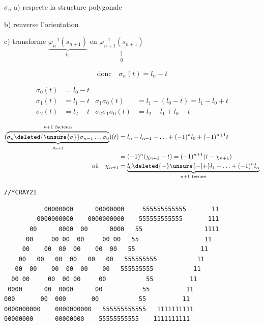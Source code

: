 

$\sigma_n$ \quad a) respecte la structure polygonale

b) renverse l'orientation

c) transforme $\underbrace{\varphi_n^{-1}(s_{n+1})}_{l_n}$ en $\underset{\substack{\Vert\\0}}{\varphi_{n+1}^{-1}(s_{n+1})}$

\[ \text{donc}\quad \sigma_n(t)=l_n-t \]

\[ \begin{aligned}
\sigma_0(t)&=l_0-t\\
\sigma_1(t)&=l_1-t &\sigma_1\sigma_0(t)&=l_1-(l_0-t)=l_1-l_0+t\\
\sigma_2(t)&=l_2-t &\sigma_2\sigma_1\sigma_0(t)&=l_2-l_1+l_0-t
\end{aligned} \]

\[ \begin{aligned}
(\underbrace{\overbrace{\sigma_n\deleted{\unsure{\sigma}}\sigma_{n-1}\ldots\sigma_0}^{n+1\ \text{facteurs}}}_{\rho_{n+1}})(t)&=l_n-l_{n-1}-\ldots+(-1)^n l_0+(-1)^{n+1}t\\
&=(-1)^n(\chi_{n+1}-t)=(-1)^{n+1}(t-\chi_{n+1})\\
\text{où}\quad \chi_{n+1}&=\underbrace{l_0\deleted{+}\unsure{-|+}l_1-\ldots+(-1)^n l_n}_{n+1\ \text{termes}}
\end{aligned} \]


\texttt{//*\quad CRAY2\qquad I}

{\scriptsize
\begin{verbatim}
           00000000      00000000     555555555555       11
         0000000000    0000000000    555555555555       111
       00      0000  00      0000   55                 1111
      00     00 00  00     00 00   55                  11
     00    00  00  00    00  00   55                  11
    00   00   00  00   00   00   555555555           11
   00  00    00  00  00    00   555555555           11
  00 00     00  00 00     00           55          11
 0000      00  0000      00           55          11
000       00  000       00           55          11
0000000000    0000000000   555555555555   1111111111
00000000      00000000    55555555555    1111111111
\end{verbatim}
}

